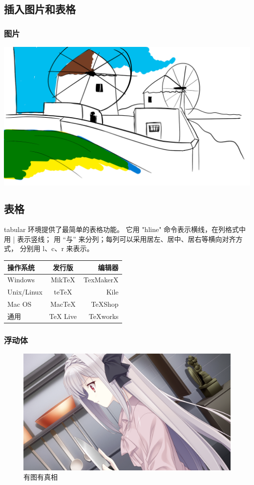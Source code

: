 \documentclass[UTF8]{ctexart}
\begin{document}
 \subsection{插入图片和表格}
     \subsubsection{图片}
         \includegraphics[width = .8\textwidth]{草图.png}
 \subsection{表格}
     tabular 环境提供了最简单的表格功能。
     它用 "hline" 命令表示横线，在列格式中用 | 表示竖线；
     用 “与” 来分列；每列可以采用居左、居中、居右等横向对齐方式，
     分别用 l、c、r 来表示。\\
     \begin{tabular}{|l|c|r|}
         \hline
         操作系统   & 发行版   & 编辑器    \\
         \hline
         Windows    & MikTeX   & TexMakerX \\
         \hline
         Unix/Linux & teTeX    & Kile      \\
         \hline
         Mac OS     & MacTeX   & TeXShop   \\
         \hline
         通用       & TeX Live & TeXworks  \\
         \hline
     \end{tabular}
     \subsubsection{浮动体}
         \begin{figure}[htbp]
             \centering
             \includegraphics[width = .8\textwidth]{lun02a.png}
             \caption{有图有真相}
             \label{fig:myphoto}
         \end{figure}
\end{document}
